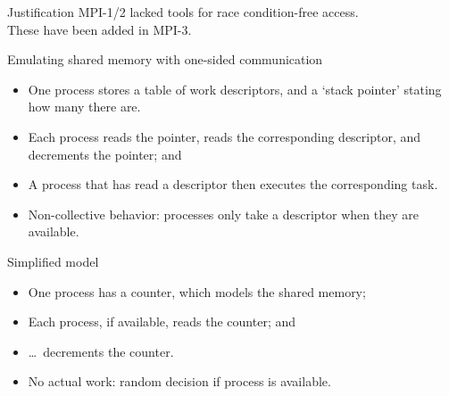 
\begin{numberedframe}{Justification}
  MPI-1/2 lacked tools for race condition-free access.\\
  These have been added in MPI-3.
\end{numberedframe}

\begin{numberedframe}{Emulating shared memory with one-sided communication}
  \begin{itemize}
  \item One process stores a table of work descriptors, and a `stack pointer'
    stating how many there are.
  \item Each process reads the pointer, reads the corresponding
    descriptor, and decrements the pointer; and
  \item A process that has read a descriptor then executes the
    corresponding task.
  \item Non-collective behavior: processes only take a descriptor when they are available.
  \end{itemize}
\end{numberedframe}

\begin{numberedframe}{Simplified model}
  \begin{itemize}
  \item One process has a counter, which models the shared memory;
  \item Each process, if available, reads the counter; and
  \item \ldots~decrements the counter.
  \item No actual work: random decision if process is available.
  \end{itemize}
\end{numberedframe}

